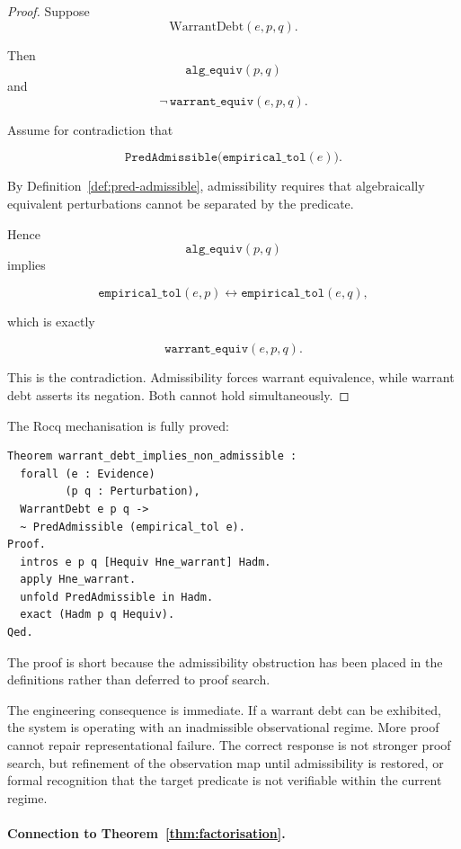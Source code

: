 \documentclass[pdflatex,sn-mathphys-num]{sn-jnl}
\theoremstyle{plain}
\theoremstyle{definition}
\theoremstyle{remark}
\newcommand{\WD}{\mathrm{WarrantDebt}}
\begin{document}
\begin{proof}

Suppose
\[
\WD(e,p,q).
\]

Then
\[
\mathtt{alg\_equiv}(p,q)
\]
and
\[
\neg\,\mathtt{warrant\_equiv}(e,p,q).
\]

Assume for contradiction that

\[
\mathtt{PredAdmissible}
\bigl(
\mathtt{empirical\_tol}(e)
\bigr).
\]

By Definition~\ref{def:pred-admissible}, admissibility requires that
algebraically equivalent perturbations cannot be separated by the
predicate.

Hence
\[
\mathtt{alg\_equiv}(p,q)
\]
implies

\[
\mathtt{empirical\_tol}(e,p)
\leftrightarrow
\mathtt{empirical\_tol}(e,q),
\]

which is exactly

\[
\mathtt{warrant\_equiv}(e,p,q).
\]

This is the contradiction.
Admissibility forces warrant equivalence, while warrant debt asserts
its negation.
Both cannot hold simultaneously.

\end{proof}

The Rocq mechanisation is fully proved:

\begin{lstlisting}[style=rocq,
caption={Warrant Debt Theorem, fully proved in Rocq.}]
Theorem warrant_debt_implies_non_admissible :
  forall (e : Evidence)
         (p q : Perturbation),
  WarrantDebt e p q ->
  ~ PredAdmissible (empirical_tol e).
Proof.
  intros e p q [Hequiv Hne_warrant] Hadm.
  apply Hne_warrant.
  unfold PredAdmissible in Hadm.
  exact (Hadm p q Hequiv).
Qed.
\end{lstlisting}

The proof is short because the admissibility obstruction has been placed
in the definitions rather than deferred to proof search.

The engineering consequence is immediate.
If a warrant debt can be exhibited, the system is operating with an
inadmissible observational regime.
More proof cannot repair representational failure.
The correct response is not stronger proof search, but refinement of
the observation map until admissibility is restored, or formal
recognition that the target predicate is not verifiable within the
current regime.

\paragraph{Connection to Theorem~\ref{thm:factorisation}.}
\end{document}
